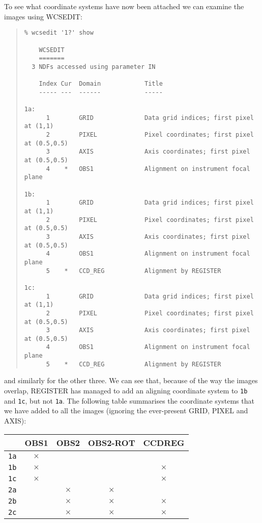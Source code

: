 \documentclass[twoside,11pt]{article}
\newcommand{\htmlref}[2]{#1}
\newcommand{\latexhtml}[2]{#1}
\renewcommand{\_}{\texttt{\symbol{95}}}
\newcommand{\ttsize}{\latexhtml{\small}{}}
\newenvironment{myquote}{\begin{quote}\ttsize}{\end{quote}}
\newcommand{\text}[1]{{\ttsize \tt #1}}
\newcommand{\routine}[1]{{\sc #1}}
\newcommand{\xroutine}[1]{\htmlref{{\sc #1}}{#1}}
\begin{document}
To see what coordinate systems have now been attached we 
can examine the images using \xroutine{WCSEDIT}:
\begin{myquote}
\begin{verbatim}
% wcsedit '1?' show

    WCSEDIT
    =======
  3 NDFs accessed using parameter IN

    Index Cur  Domain            Title
    ----- ---  ------            -----

1a:
      1        GRID              Data grid indices; first pixel at (1,1)
      2        PIXEL             Pixel coordinates; first pixel at (0.5,0.5)
      3        AXIS              Axis coordinates; first pixel at (0.5,0.5)
      4    *   OBS1              Alignment on instrument focal plane

1b:
      1        GRID              Data grid indices; first pixel at (1,1)
      2        PIXEL             Pixel coordinates; first pixel at (0.5,0.5)
      3        AXIS              Axis coordinates; first pixel at (0.5,0.5)
      4        OBS1              Alignment on instrument focal plane
      5    *   CCD_REG           Alignment by REGISTER

1c:
      1        GRID              Data grid indices; first pixel at (1,1)
      2        PIXEL             Pixel coordinates; first pixel at (0.5,0.5)
      3        AXIS              Axis coordinates; first pixel at (0.5,0.5)
      4        OBS1              Alignment on instrument focal plane
      5    *   CCD_REG           Alignment by REGISTER
\end{verbatim}
\end{myquote}
and similarly for the other three.
We can see that, because of the way the images overlap,
\routine{REGISTER} has managed to add an aligning coordinate system 
to \text{1b} and \text{1c}, but not \text{1a}.
The following table summarises the coordinate systems that we have 
added to all the images (ignoring the ever-present GRID, PIXEL and AXIS):
\begin{center}
\begin{tabular}{l|c|c|c|c|}
           & OBS1     & OBS2     & OBS2-ROT & CCD\_REG \\
\hline
\text{1a} & $\times$ &          &          &          \\
\hline
\text{1b} & $\times$ &          &          & $\times$ \\
\hline
\text{1c} & $\times$ &          &          & $\times$ \\
\hline
\text{2a} &          & $\times$ & $\times$ &          \\
\hline
\text{2b} &          & $\times$ & $\times$ & $\times$ \\
\hline
\text{2c} &          & $\times$ & $\times$ & $\times$ \\
\hline
\end{tabular}
\end{center}
\end{document}
